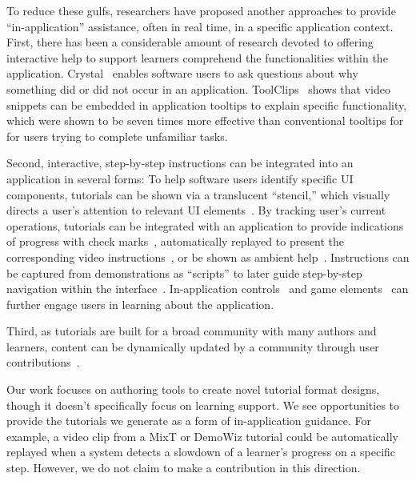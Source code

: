 To reduce these gulfs, researchers have proposed another approaches to provide ``in-application'' assistance, often in real time, in a specific application context.
First, there has been a considerable amount of research devoted to offering interactive help to support learners comprehend the functionalities within the application.
%
Crystal~\cite{Myers:2006:AWW:1124772.1124832} enables software users to ask questions about why something did or did not occur in an application.
%
ToolClips~\cite{Grossman:2010wr} shows that video snippets can be embedded in application tooltips to explain specific functionality, which were shown to be seven times more effective than conventional tooltips for for users trying to complete unfamiliar tasks.

Second, interactive, step-by-step instructions can be integrated into an application in several forms:
%
To help software users identify specific UI components, tutorials can be shown via a translucent ``stencil,'' which visually directs a user's attention to relevant UI elements~\cite{Kelleher:2005:STD:1054972.1055047}.
%
By tracking user's current operations, tutorials can be integrated with an application to provide indications of progress with check marks~\cite{Fernquist:2011:SRE:2047196.2047245}, automatically replayed to present the corresponding video instructions~\cite{Pongnumkul:2011ju}, or be shown as ambient help~\cite{Matejka:2011:AH:1978942.1979349}.
%
Instructions can be captured from demonstrations as ``scripts'' to later guide step-by-step navigation within the interface~\cite{Bergman:2005:DocWizards}. In-application controls~\cite{Lieberman:2014:SML:2557500.2557543} and game elements~\cite{Li:2014:CGM:2556288.2556954, Dontcheva:2014:CCL:2556288.2557217} can further engage users in learning about the application.

Third, as tutorials are built for a broad community with many authors and learners, content can be dynamically updated by a community through user contributions~\cite{Lafreniere:2013ff,Matejka:2009:CCR:1622176.1622214, Bunt:2014:TPI:2556288.2557118}.

Our work focuses on authoring tools to create novel tutorial format designs, though it doesn't specifically focus on learning support. We see opportunities to provide the tutorials we generate as a form of in-application guidance. For example, a video clip from a MixT or DemoWiz tutorial could be automatically replayed when a system detects a slowdown of a learner's progress on a specific step. However, we do not claim to make a contribution in this direction.


